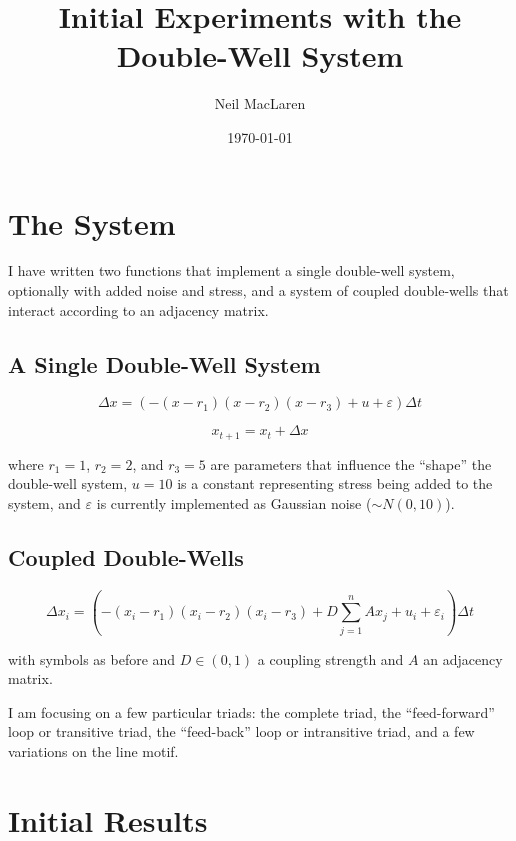 \documentclass[11pt, letterpaper]{article}
\title{Initial Experiments with the Double-Well System}
\author{Neil MacLaren}
\date{\today}
\begin{document}
\maketitle

\section{The System}

I have written two functions that implement a single double-well system, optionally with added noise and stress, and a system of coupled double-wells that interact according to an adjacency matrix.

\subsection{A Single Double-Well System}

\begin{equation}
  \Delta x = (-(x - r_1)(x - r_2)(x - r_3) + u + \varepsilon)\Delta t
\end{equation}

\begin{equation}
  x_{t+1} = x_t + \Delta x
\end{equation}

\noindent where $r_1 = 1$, $r_2 = 2$, and $r_3 = 5$ are parameters that influence the ``shape'' the double-well system, $u = 10$ is a constant representing stress being added to the system, and $\varepsilon$ is currently implemented as Gaussian noise ($\sim N(0, 10)$). 

\subsection{Coupled Double-Wells}

\begin{equation}
  \Delta x_i = (-(x_i - r_1)(x_i - r_2)(x_i - r_3) + D \sum_{j=1}^n Ax_j + u_i + \varepsilon_i)\Delta t
\end{equation}

\noindent with symbols as before and $D \in (0, 1)$  a coupling strength and $A$ an adjacency matrix.

I am focusing on a few particular triads: the complete triad, the ``feed-forward'' loop or transitive triad, the ``feed-back'' loop or intransitive triad, and a few variations on the line motif.

\section{Initial Results}
\end{document}
